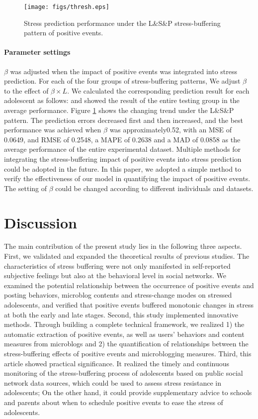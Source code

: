 \documentclass[5p,times,numbers,authoryear]{elsarticle}
\begin{document}
\begin{figure}
\centering
\caption{Stress prediction performance under the L\&S\&P stress-buffering pattern of positive events.}
\texttt{[image: figs/thresh.eps]}
\label{fig:thresh}
\end{figure}

\paragraph{Parameter settings}
$\beta$ was adjusted when the impact of positive events was integrated into stress prediction.
For each of the four groups of stress-buffering patterns,
We adjust $\beta$ to the effect of $\beta \times L$.
{We calculated the corresponding prediction result for each adolescent as follows:}
and showed the result of the entire testing group in the average performance.
Figure \ref{fig:thresh} shows the changing trend under the L\&S\&P pattern.
The prediction errors decreased first and then increased,
and the best performance was achieved when $\beta$ was approximately0.52,
with an MSE of 0.0649, and RMSE of 0.2548, a MAPE of 0.2638 and a MAD of 0.0858 as the average performance of the entire experimental dataset.
Multiple methods for integrating the stress-buffering impact of positive events into stress prediction could be adopted in the future.
In this paper, we adopted a simple method to verify the effectiveness of our model in quantifying the impact of positive events.
The setting of $\beta$ could be changed according to different individuals and datasets.


\section{Discussion}
\label{sec:conclude}
The main contribution of the present study lies in the following three aspects.
First, we validated and expanded the theoretical results of previous studies.
The characteristics of stress buffering were not only manifested in self-reported subjective feelings but also at the behavioral level in social networks.
We examined the potential relationship between the occurrence of positive events and posting behaviors, microblog contents and stress-change modes on stressed adolescents,
and verified that positive events buffered monotonic changes in stress at both the early and late stages.
Second, this study implemented innovative methods.
Through building a complete technical framework,
we realized
1) the automatic extraction of positive events, as well as users' behaviors and content measures from microblogs
and 2) the quantification of relationships between the stress-buffering effects of positive events and microblogging measures.
Third, this article showed practical significance.
It realized the timely and continuous monitoring of the stress-buffering process
of adolescents based on public social network data sources,
which could be used to assess stress resistance in adolescents;
On the other hand, it could provide supplementary advice to schools and parents about when to schedule positive events to ease the stress of adolescents.
\end{document}

